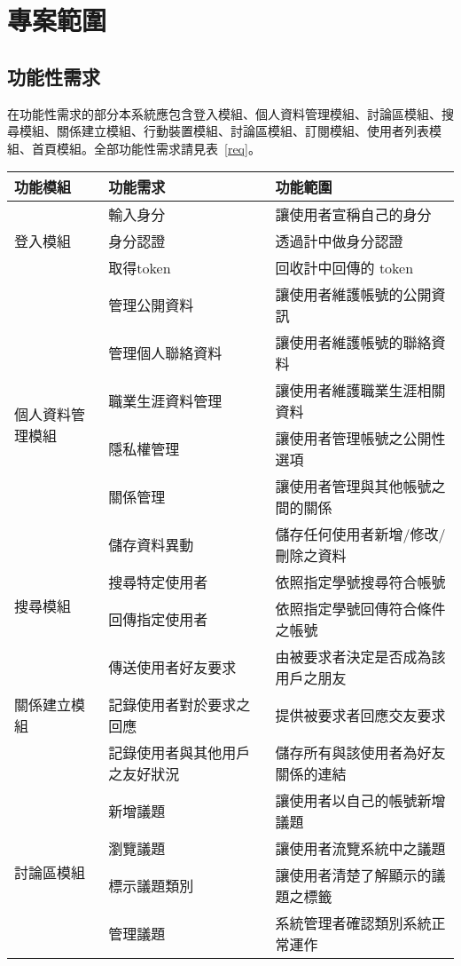 \documentclass[11pt]{article}
\begin{document}
\section{專案範圍}

\subsection{功能性需求}
在功能性需求的部分本系統應包含登入模組、個人資料管理模組、討論區模組、搜尋模組、關係建立模組、行動裝置模組、討論區模組、訂閱模組、使用者列表模組、首頁模組。全部功能性需求請見表~\ref{req}。

\begin{table}[t]
\centering
\begin{tabular}{ | l | l | l | }
\hline
功能模組 & 功能需求 & 功能範圍 \\ \hline \hline
\multirow{3}{*}{登入模組} 
& 輸入身分 & 讓使用者宣稱自己的身分\\
& 身分認證 & 透過計中做身分認證 \\
& 取得token & 回收計中回傳的 token \\ \hline
\multirow{6}{*}{個人資料管理模組} 
& 管理公開資料 & 讓使用者維護帳號的公開資訊 \\
& 管理個人聯絡資料& 讓使用者維護帳號的聯絡資料\\
& 職業生涯資料管理& 讓使用者維護職業生涯相關資料 \\
& 隱私權管理& 讓使用者管理帳號之公開性選項 \\
& 關係管理& 讓使用者管理與其他帳號之間的關係 \\
& 儲存資料異動& 儲存任何使用者新增/修改/刪除之資料 \\ \hline
\multirow{2}{*}{搜尋模組} 
& 搜尋特定使用者 & 依照指定學號搜尋符合帳號 \\
& 回傳指定使用者 & 依照指定學號回傳符合條件之帳號 \\ \hline
 \multirow{3}{*}{關係建立模組} 
& 傳送使用者好友要求 & 由被要求者決定是否成為該用戶之朋友 \\ 
& 記錄使用者對於要求之回應 & 提供被要求者回應交友要求 \\
& 記錄使用者與其他用戶之友好狀況 & 儲存所有與該使用者為好友關係的連結 \\ \hline
\multirow{4}{*}{討論區模組}
& 新增議題 & 讓使用者以自己的帳號新增議題 \\
& 瀏覽議題 & 讓使用者流覽系統中之議題 \\
& 標示議題類別 & 讓使用者清楚了解顯示的議題之標籤 \\
& 管理議題 & 系統管理者確認類別系統正常運作 \\ \hline

\end{tabular}
\end{table}
\end{document}
